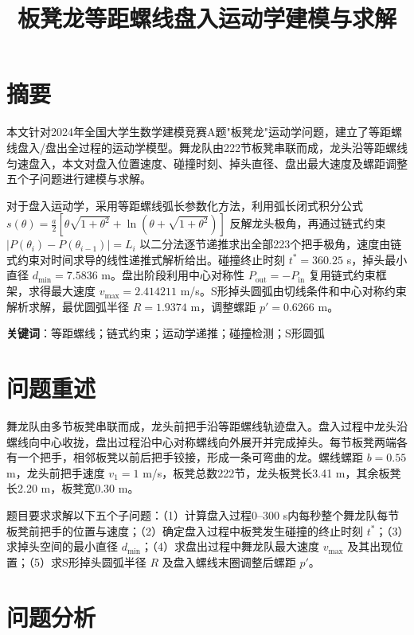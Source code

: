\documentclass[12pt,a4paper]{article}
\title{板凳龙等距螺线盘入运动学建模与求解}
\author{}
\date{}
\begin{document}
\maketitle

\section*{摘要}

本文针对2024年全国大学生数学建模竞赛A题"板凳龙"运动学问题，建立了等距螺线盘入/盘出全过程的运动学模型。舞龙队由222节板凳串联而成，龙头沿等距螺线匀速盘入，本文对盘入位置速度、碰撞时刻、掉头直径、盘出最大速度及螺距调整五个子问题进行建模与求解。

对于盘入运动学，采用等距螺线弧长参数化方法，利用弧长闭式积分公式 $s(\theta)=\frac{a}{2}\left[\theta\sqrt{1+\theta^2}+\ln\left(\theta+\sqrt{1+\theta^2}\right)\right]$ 反解龙头极角，再通过链式约束 $|P(\theta_i)-P(\theta_{i-1})|=L_i$ 以二分法逐节递推求出全部223个把手极角，速度由链式约束对时间求导的线性递推式解析给出。碰撞终止时刻 $t^*=360.25$ s，掉头最小直径 $d_{\min}=7.5836$ m。盘出阶段利用中心对称性 $P_{\text{out}}=-P_{\text{in}}$ 复用链式约束框架，求得最大速度 $v_{\max}=2.414211$ m/s。S形掉头圆弧由切线条件和中心对称约束解析求解，最优圆弧半径 $R=1.9374$ m，调整螺距 $p'=0.6266$ m。

\textbf{关键词}：等距螺线；链式约束；运动学递推；碰撞检测；S形圆弧

\section{问题重述}

舞龙队由多节板凳串联而成，龙头前把手沿等距螺线轨迹盘入。盘入过程中龙头沿螺线向中心收拢，盘出过程沿中心对称螺线向外展开并完成掉头。每节板凳两端各有一个把手，相邻板凳以前后把手铰接，形成一条可弯曲的龙。螺线螺距 $b=0.55$ m，龙头前把手速度 $v_1=1$ m/s，板凳总数222节，龙头板凳长3.41 m，其余板凳长2.20 m，板凳宽0.30 m。

题目要求求解以下五个子问题：（1）计算盘入过程0--300 s内每秒整个舞龙队每节板凳前把手的位置与速度；（2）确定盘入过程中板凳发生碰撞的终止时刻 $t^*$；（3）求掉头空间的最小直径 $d_{\min}$；（4）求盘出过程中舞龙队最大速度 $v_{\max}$ 及其出现位置；（5）求S形掉头圆弧半径 $R$ 及盘入螺线末圈调整后螺距 $p'$。

\section{问题分析}
\end{document}

